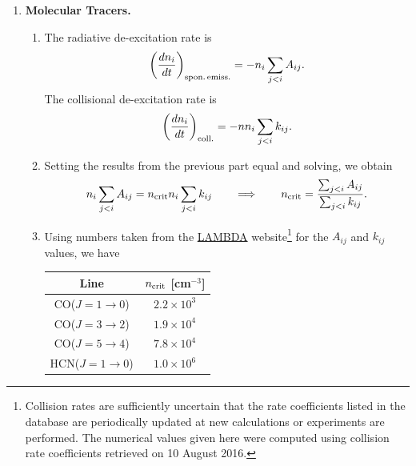 \solutionset

\begin{enumerate}

\item \textbf{Molecular Tracers.}

\begin{enumerate}

\item The radiative de-excitation rate is
\begin{displaymath}
\left(\frac{dn_i}{dt}\right)_{\rm spon.\,emiss.} = -n_i \sum_{j<i} A_{ij} .
\end{displaymath}
The collisional de-excitation rate is
\begin{displaymath}
\left(\frac{dn_i}{dt}\right)_{\rm coll.} = -n n_i \sum_{j<i} k_{ij}.
\end{displaymath}

\item Setting the results from the previous part equal and solving, we obtain
\begin{displaymath}
 n_i \sum_{j<i} A_{ij} = n_{\rm crit} n_i \sum_{j<i} k_{ij} 
 \qquad \Longrightarrow \qquad
 n_{\rm crit} = \frac{\sum_{j<i} A_{ij}}{\sum_{j<i} k_{ij}}.
 \end{displaymath}
 
\item
Using numbers taken from the \href{http://www.strw.leidenuniv.nl/~moldata}{LAMBDA} website\footnote{Collision rates are
sufficiently uncertain that the rate coefficients listed in the
database are periodically updated at new calculations or experiments
are performed. The numerical values given here were computed using
collision rate coefficients retrieved on 10 August 2016.} for the $A_{ij}$ and $k_{ij}$ values, we have
\begin{center}
\begin{tabular}{c|c}
Line & $n_{\rm crit}$ [cm$^{-3}$] \\ \hline
CO($J=1\rightarrow 0$) & $2.2\times 10^3$ \\
CO($J=3\rightarrow 2$) & $1.9 \times 10^4$ \\
CO($J=5\rightarrow 4$) & $7.8\times 10^4$ \\
HCN($J=1\rightarrow 0$) & $1.0\times 10^6$
\end{tabular}
\end{center}


\end{enumerate}
\end{enumerate}

